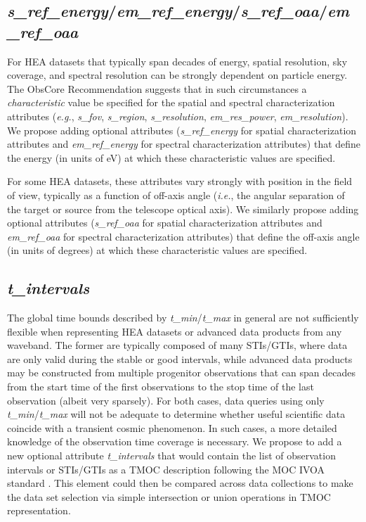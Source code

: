 \documentclass[11pt,a4paper]{ivoa}
\begin{document}
\subsection{{\em s\_ref\_energy\/}/{\em em\_ref\_energy\/}/{\em s\_ref\_oaa\/}/{\em em\_ref\_oaa}}

For \gls{HEA} datasets that typically span decades of energy, spatial resolution, sky coverage, and spectral resolution can be strongly dependent on particle energy. The ObsCore Recommendation suggests that in such circumstances a {\em characteristic\/} value be specified for the spatial and spectral characterization attributes ({\em e.g.\/}, {\em s\_fov\/}, {\em s\_region\/}, {\em s\_resolution\/}, {\em em\_res\_power\/}, {\em em\_resolution\/}). We propose adding optional attributes ({\em s\_ref\_energy\/} for spatial characterization attributes and {\em em\_ref\_energy\/} for spectral characterization attributes) that define the energy (in units of eV) at which these characteristic values are specified.

For some \gls{HEA} datasets, these attributes vary strongly with position in the field of view, typically as a function of off-axis angle ({\em i.e.\/}, the angular separation of the target or source from the telescope optical axis). We similarly propose adding optional attributes ({\em s\_ref\_oaa\/} for spatial characterization attributes and {\em em\_ref\_oaa\/} for spectral characterization attributes) that define the off-axis angle (in units of degrees) at which these characteristic values are specified.

\subsection{{\em t\_intervals}}

The global time bounds described by {\em t\_min\/}/{\em t\_max\/} in general are not sufficiently flexible when representing \gls{HEA} datasets or advanced data products from any waveband.  The former are typically composed of many \glspl{STI}/\glspl{GTI}, where data are only valid during the stable or good intervals, while advanced data products may be constructed from multiple progenitor observations that can span decades from the start time of the first observations to the stop time of the last observation (albeit very sparsely).  For both cases, data queries using only {\em t\_min\/}/{\em t\_max\/} will not be adequate to determine whether useful scientific data coincide with a transient cosmic phenomenon.  In such cases, a more detailed knowledge of the observation time coverage is necessary.  We propose to add a new optional attribute {\em t\_intervals\/} that would contain the list of observation intervals or \glspl{STI}/\glspl{GTI} as a TMOC description following the \gls{MOC} IVOA standard  \citep{2022ivoa.spec.0727F}. This element could then be compared across data collections to make the data set selection via simple intersection or union operations in TMOC representation.
\end{document}
